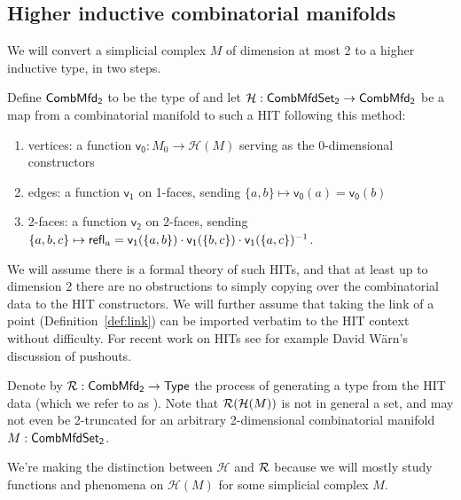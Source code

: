 \subsection{Higher inductive combinatorial manifolds}

We will convert a simplicial complex \( M \) of dimension at most 2 to a higher inductive type, in two steps. 

\begin{mydef}
Define \( \mathsf{CombMfd_2} \) to be the type of  and let \( \mathcal{H}:\mathsf{CombMfdSet_2}\to\mathsf{CombMfd_2} \) be a map from a combinatorial manifold to such a HIT following this method:
\begin{enumerate}
\item vertices: a function \( \mathsf{v_0}:M_0\to \mathcal{H}(M) \) serving as the 0-dimensional constructors
\item edges: a function \( \mathsf{v_1} \) on 1-faces, sending \( \{a, b\}\mapsto \mathsf{v_0}(a)=\mathsf{v_0}(b) \)
\item 2-faces: a function \( \mathsf{v_2} \) on 2-faces, sending \( \{a, b, c\}\mapsto \mathsf{refl}_a = \mathsf{v_1}(\{a, b\})\cdot \mathsf{v_1}(\{b, c\})\cdot \mathsf{v_1}(\{a, c\})^{-1} \).
\end{enumerate}
\end{mydef}

We will assume there is a formal theory of such HITs, and that at least up to dimension 2 there are no obstructions to simply copying over the combinatorial data to the HIT constructors. We will further assume that taking the link of a point (Definition~\ref{def:link}) can be imported verbatim to the HIT context without difficulty. For recent work on HITs see for example David Wärn's discussion of pushouts\cite{warn_pushouts}.

\begin{mydef}
Denote by \( \mathcal{R}:\mathsf{CombMfd_2}\to\mathsf{Type} \) the process of generating a type from the HIT data (which we refer to as ). Note that \( \mathcal{R}(\mathcal{H}(M)) \) is not in general a set, and may not even be 2-truncated for an arbitrary 2-dimensional combinatorial manifold \( M:\mathsf{CombMfdSet_2} \).
\end{mydef}

We're making the distinction between \( \mathcal{H} \) and \( \mathcal{R} \) because we will mostly study functions and phenomena on \( \mathcal{H}(M) \) for some simplicial complex \( M \).

